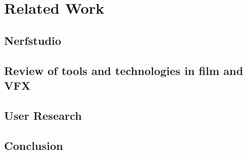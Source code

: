 %
\chapter{Related Work}
\label{sec:related}

\section{Nerfstudio}


\section{Review of tools and technologies in film and VFX}
\label{sec:related:vfx}


\section{User Research}
\label{sec:related:ux}


\section{Conclusion}
\label{sec:related:conclusion}

